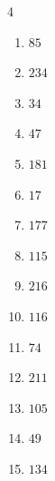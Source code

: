 \begin{multicols}{4}
\begin{enumerate}
\resetques

  \item $85$


  \item $234$


  \item $34$


  \item $47$


  \item $181$


  \item $17$


  \item $177$


  \item $115$


  \item $216$


  \item $116$


  \item $74$


  \item $211$


  \item $105$


  \item $49$


  \item $134$


\columnbreak %


\end{enumerate}
\end{multicols}
